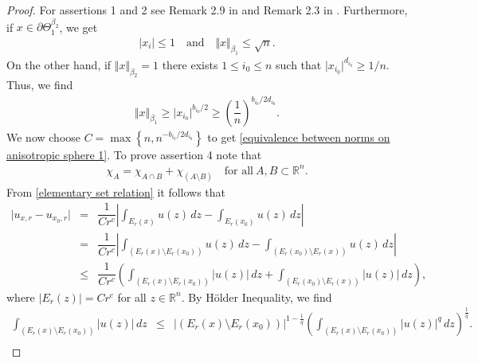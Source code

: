 \documentclass[10pt, leqno]{article}
\theoremstyle{definition}
\theoremstyle{remark}
\numberwithin{equation}{section}
\begin{document}
\begin{proof}
For assertions 1 and 2 see Remark 2.9 in \cite{CLU} and Remark 2.3 in \cite{LEITAO}. Furthermore, if $x \in \partial \Theta^{\beta_{2}}_{1}$, we get
\begin{eqnarray}
\vert x_{i} \vert \leq 1 \quad \text{and} \quad \Vert x \Vert_{\beta_{1}}\leq \sqrt{n}.
\end{eqnarray}
On the other hand, if $\Vert x \Vert_{\beta_{2}} = 1$ there exists $1 \leq i_{0} \leq n$ such that $\vert x_{i_{0}} \vert^{d_{i_{0}}} \geq 1/n$. Thus, we find
\begin{eqnarray}
\Vert x \Vert_{\beta_{1}} \geq \vert x_{i_{0}} \vert^{b_{i_{0}}/2} \geq \left( \dfrac{1}{n}\right)^{b_{i_{0}}/2d_{i_{0}}}.
\end{eqnarray}
We now choose $C = \max \left\lbrace n, n^{-b_{i_{0}}/2d_{i_{0}}}\right\rbrace$ to get \eqref{equivalence between norms on anisotropic sphere 1}. To prove assertion 4 note that
\begin{eqnarray}
\label{elementary set relation}
\chi_{A} = \chi_{A \cap B} + \chi_{(A \setminus B)} \quad \text{for all} \ A, B \subset \mathbb{R}^{n}.
\end{eqnarray}
From \eqref{elementary set relation} it follows that
\begin{eqnarray}
\label{elementary lemma 1}
\vert u_{x, r} - u_{x_{0}, r} \vert & = & \nonumber \dfrac{1}{Cr^{c}}\left | \displaystyle \int_{E_{r}(x)}u(z)\, dz - \displaystyle \int_{E_{r}(x_{0})}u(z)\, dz  \right |^{} \\
& = & \dfrac{1}{Cr^{c}}\left | \displaystyle \int_{(E_{r}(x)\setminus E_{r}(x_{0}))}u(z)\, dz - \displaystyle \int_{(E_{r}(x_{0})\setminus E_{r}(x_{}))}u(z)\, dz  \right |^{} \\ \nonumber
& \leq & \dfrac{1}{Cr^{c}} \left( \displaystyle \int_{(E_{r}(x)\setminus E_{r}(x_{0}))} \vert u(z) \vert \, dz + \displaystyle \int_{(E_{r}(x_{0})\setminus E_{r}(x_{}))} \vert u(z) \vert \, dz \right),
\end{eqnarray}
where $\vert E_{r}(z) \vert = C r^{c}$ for all $z \in \mathbb{R}^{n}$. By  H\" older Inequality, we find
\begin{eqnarray}
\label{elementary lemma 2}
\displaystyle \int_{(E_{r}(x)\setminus E_{r}(x_{0}))} \vert u(z) \vert \, dz & \leq & \vert (E_{r}(x)\setminus E_{r}(x_{0}))\vert^{1-\frac{1}{q}} \left( \displaystyle \int_{(E_{r}(x)\setminus E_{r}(x_{0}))} \vert u(z) \vert^{q} \, dz \right)^{\frac{1}{q}}. \\ \nonumber
\end{eqnarray}

\end{proof}
\end{document}
